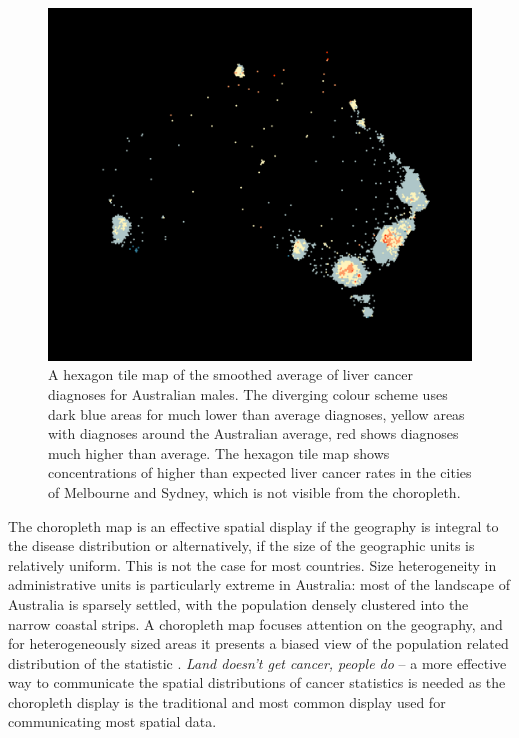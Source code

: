 \documentclass{monashthesis}
\begin{document}
\begin{figure}[H]
\centering
\includegraphics[width=16cm]{figures/04-experiment/aus_liver_m_hex.pdf}
\caption{\label{fig:liver-hex}A hexagon tile map of the smoothed average of liver cancer diagnoses for Australian males. The diverging colour scheme uses dark blue areas for much lower than average diagnoses, yellow areas with diagnoses around the Australian average, red shows diagnoses much higher than average. The hexagon tile map shows concentrations of higher than expected liver cancer rates in the cities of Melbourne and Sydney, which is not visible from the choropleth.}
\end{figure}

The choropleth map is an effective spatial display if the geography is integral to the disease distribution or alternatively, if the size of the geographic units is relatively uniform. This is not the case for most countries. Size heterogeneity in administrative units is particularly extreme in Australia: most of the landscape of Australia is sparsely settled, with the population densely clustered into the narrow coastal strips. A choropleth map focuses attention on the geography, and for heterogeneously sized areas it presents a biased view of the population related distribution of the statistic \autocite{CBATCC}. \emph{Land doesn't get cancer, people do} -- a more effective way to communicate the spatial distributions of cancer statistics is needed as the choropleth display is the traditional and most common display used for communicating most spatial data.
\end{document}
